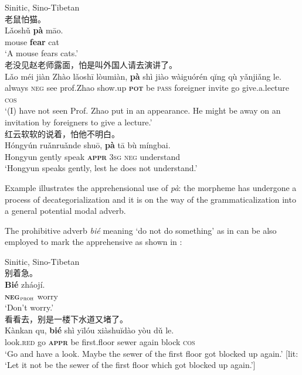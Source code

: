 \documentclass[output=paper,colorlinks,citecolor=brown, language=chinese]{langscibook}
\begin{document}
\ea \label{ex:Song5} 
 {Sinitic, Sino-Tibetan} {\cite{Gao2003}} \\
\ea \label{ex:Song5a} {\cn 老鼠怕猫。}\\
\gll Lǎoshǔ	\textbf{pà} māo. \\
mouse \textbf{fear} cat \\
\glt `A mouse fears cats.' \\
\ex \label{ex:Song5b} {\cn 老没见赵老师露面，怕是叫外国人请去演讲了。} \\
\gll Lǎo méi jiàn {Zhào lǎoshī} lòumiàn, \textbf{pà} shì jiào wàiguórén qĭng qù yǎnjiǎng le. \\
always \textsc{neg} see prof.Zhao show.up \textbf{\textsc{pot}} be \textsc{pass} foreigner invite go give.a.lecture \textsc{cos} \\
\glt `(I) have not seen Prof. Zhao put in an appearance. He might be away on an invitation by foreigners to give a lecture.' \\
\ex \label{ex:Song5c} {\cn 红云软软的说着，怕他不明白。}\\
\gll Hóngyún ruǎnruǎnde shuō, \textbf{pà} tā bù míngbai. \\
Hongyun gently speak \textsc{\textbf{appr}} \textsc{3sg} \textsc{neg} understand \\
\glt `Hongyun speaks gently, lest he does not understand.'
\z
\z

\noindent Example  illustrates the apprehensional use of \textit{pà}: the morpheme has undergone a process of decategorialization \citep[104]{HopperTraugott1993} and it is on the way of the grammaticalization into a general potential modal adverb.

The prohibitive adverb \textit{bié} meaning `do not do something' as in  can be also employed to mark the apprehensive as shown in :

\newpage
\ea \label{ex:Song6} 
 {Sinitic, Sino-Tibetan} {\cite{Gao2003}} \\
\ea \label{ex:Song6a} {\cn 别着急。}\\
\gll \textbf{Bié} zháojí. \\
\textbf{\textsc{neg$_{\mathrm{\textsc{proh}}}$}} worry \\
\glt `Don't worry.' \\
\ex \label{ex:Song6b} {\cn 看看去，别是一楼下水道又堵了。}\\
\gll Kànkan qu, \textbf{bié} shì yīlóu xiàshuĭdào yòu dǔ le.  \\
look.\textsc{red} go \textsc{\textbf{appr}} be first.floor sewer again block \textsc{cos} \\
\glt `Go and have a look. Maybe the sewer of the first floor got blocked up again.' [lit: `Let it not be the sewer of the first floor which got blocked up again.']
\z
\z
\end{document}
